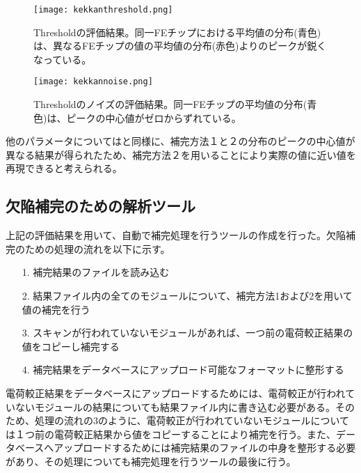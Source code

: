 \begin{figure}[tbp]
  \begin{minipage}[b]{0.5\linewidth}
    \centering
    \texttt{[image: kekkanthreshold.png]}
    \caption[Thresholdの評価結果]{Thresholdの評価結果。同一FEチップにおける平均値の分布(青色)は、異なるFEチップの値の平均値の分布(赤色)よりのピークが鋭くなっている。}
    \label{fig:kekkanthreshold}
  \end{minipage}
  \begin{minipage}[b]{0.5\linewidth}
    \centering
    \texttt{[image: kekkannoise.png]}
    \caption[Thresholdのノイズの評価結果]{Thresholdのノイズの評価結果。同一FEチップの平均値の分布(青色)は、ピークの中心値がゼロからずれている。}
    \label{fig:kekkannoise}
  \end{minipage}
\end{figure}

他のパラメータについてはと同様に、補完方法１と２の分布のピークの中心値が異なる結果が得られたため、補完方法２を用いることにより実際の値に近い値を再現できると考えられる。

\subsection{欠陥補完のための解析ツール}
上記の評価結果を用いて、自動で補完処理を行うツールの作成を行った。欠陥補完のための処理の流れを以下に示す。
\begin{itemize}
  \item[1. ] 補完結果のファイルを読み込む
  \item[2. ] 結果ファイル内の全てのモジュールについて、補完方法1および2を用いて値の補完を行う
  \item[3. ] スキャンが行われていないモジュールがあれば、一つ前の電荷較正結果の値をコピーし補完する
  \item[4. ] 補完結果をデータベースにアップロード可能なフォーマットに整形する
\end{itemize}

電荷較正結果をデータベースにアップロードするためには、電荷較正が行われていないモジュールの結果についても結果ファイル内に書き込む必要がある。そのため、処理の流れの3のように、電荷較正が行われていないモジュールについては１つ前の電荷較正結果から値をコピーすることにより補完を行う。また、データベースへアップロードするためには補完結果のファイルの中身を整形する必要があり、その処理についても補完処理を行うツールの最後に行う。

